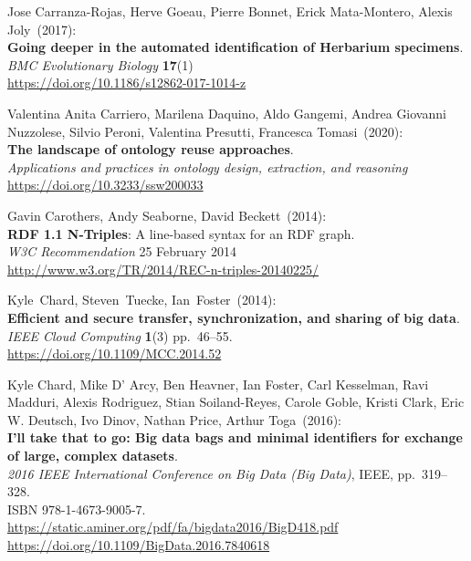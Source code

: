 \begin{thebibliography}{9}
Jose Carranza-Rojas, Herve Goeau, Pierre Bonnet, Erick Mata-Montero, Alexis Joly~(2017): \\
\textbf{Going deeper in the automated identification of Herbarium specimens}.\\
\emph{BMC Evolutionary Biology} \textbf{17}(1)\\
\url{https://doi.org/10.1186/s12862-017-1014-z}

Valentina Anita Carriero, Marilena Daquino, Aldo Gangemi, Andrea Giovanni Nuzzolese, Silvio Peroni, Valentina Presutti, Francesca Tomasi~(2020): \\
\textbf{The landscape of ontology reuse approaches}. \\
\emph{Applications and practices in ontology design, extraction, and reasoning} \\
\url{https://doi.org/10.3233/ssw200033}

Gavin Carothers, Andy Seaborne, David Beckett~(2014): \\
\textbf{RDF 1.1 N-Triples}: A line-based syntax for an RDF graph.\\
\emph{W3C Recommendation} 25 February 2014\\
\url{http://www.w3.org/TR/2014/REC-n-triples-20140225/}

Kyle~Chard, Steven~Tuecke, Ian~Foster~(2014): \\
\textbf{Efficient and secure transfer, synchronization, and sharing of big data}.\\
\emph{IEEE Cloud Computing} \textbf{1}(3) pp.~46--55.\\
\url{https://doi.org/10.1109/MCC.2014.52}

Kyle Chard, Mike D' Arcy, Ben Heavner, Ian Foster, Carl Kesselman, Ravi Madduri, Alexis Rodriguez, Stian Soiland-Reyes, Carole Goble, Kristi Clark, Eric W. Deutsch, Ivo Dinov, Nathan Price, Arthur Toga~(2016): \\
\textbf{I'll take that to go: Big data bags and minimal identifiers for exchange of large, complex datasets}.\\
\emph{2016 IEEE International Conference on Big Data (Big Data)}, IEEE,
pp.~319--328.\\
ISBN 978-1-4673-9005-7.\\
\url{https://static.aminer.org/pdf/fa/bigdata2016/BigD418.pdf}\\
\url{https://doi.org/10.1109/BigData.2016.7840618}


\end{thebibliography}
